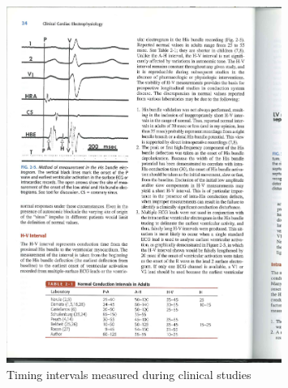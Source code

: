 \begin{figure}[!t]
\centering
		\includegraphics[width=0.8\textwidth]{figs/intervals.pdf}
		
\caption{\small Timing intervals measured during clinical studies \cite{josephson}}
\label{fig:intervals}
\end{figure} 





